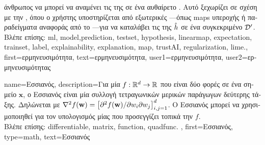 {{{		άνθρωπος να μπορεί να αναμένει τις}  \foreignlanguage{greek}{της σε ένα αυθαίρετο} 
	 	. \foreignlanguage{greek}{Αυτό ξεχωρίζει σε σχέση με την} , 
		\foreignlanguage{greek}{όπου ο χρήστης υποστηρίζεται από εξωτερικές} —\foreignlanguage{greek}{όπως}  
		\gls{map}s \foreignlanguage{greek}{υπεροχής ή παραδείγματα αναφοράς από το} —\foreignlanguage{greek}{για 
		να καταλάβει τις}  \foreignlanguage{greek}{της $\hat{h}$ σε ένα συγκεκριμένο} 
		 $\mathcal{D}'$. \\ 
	 	\foreignlanguage{greek}{Βλέπε επίσης:} \gls{ml}, \gls{model},\gls{prediction}, \gls{testset}, \gls{hypothesis}, \gls{linearmap}, \gls{expectation}, 
		\gls{trainset}, \gls{label}, \gls{explainability}, \gls{explanation}, \gls{map}, \gls{trustAI}, \gls{regularization}, \gls{lime}.},
	first={\foreignlanguage{greek}{ερμηνευσιμότητα}},
	text={\foreignlanguage{greek}{ερμηνευσιμότητα}},
	user1={\foreignlanguage{greek}{ερμηνευσιμότητα}}, %
	user2={\foreignlanguage{greek}{ερμηνευσιμότητας}} %
}

{name={\foreignlanguage{greek}{Εσσιανός}},
 	description={\foreignlanguage{greek}{Για μία}  $f: \mathbb{R}^{d} \to \mathbb{R}$ 
 		\foreignlanguage{greek}{που είναι δύο φορές}  \foreignlanguage{greek}{σε ένα σημείο $\mathbf{x}$, ο Εσσιανός 
		είναι μία συλλογή τετραγωνικών}  \foreignlanguage{greek}{μερικών παράγωγων δεύτερης τάξης. 
 		Δηλώνεται με $\nabla^2 f({\bf w}) = \left[ {\partial^2 f({\bf w})}/{\partial w_i \partial w_j} \right]_{i,j=1}^{d}$. 
        		Ο Εσσιανός μπορεί να χρησιμοποιηθεί για τον υπολογισμός μίας}  \foreignlanguage{greek}{που 
		προσεγγίζει τοπικά την} $f$. \\
		\foreignlanguage{greek}{Βλέπε επίσης:} \gls{differentiable}, \gls{matrix}, \gls{function}, \gls{quadfunc}. }, 
	first={\foreignlanguage{greek}{Εσσιανός}},
	type=math,
	text={\foreignlanguage{greek}{Εσσιανός}}
}

